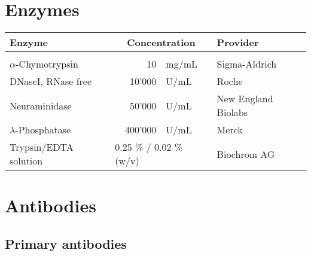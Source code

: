 \section{Enzymes}

\begin{center}

\begin{longtable}{l r p{1cm} l}
\textbf{Enzyme} & \multicolumn{2}{c}{\textbf{Concentration}} & \textbf{Provider}\\
\hline
\\
$\alpha$-Chymotrypsin & 10 & mg/mL & Sigma-Aldrich \\
DNaseI, RNase free & 10'000 & U/mL & Roche \\
Neuraminidase & 50'000 & U/mL & New England Biolabs \\
$\lambda$-Phosphatase & 400'000 & U/mL & Merck \\
Trypsin/EDTA solution & \multicolumn{2}{l}{0.25 \% / 0.02 \% (w/v)} & Biochrom AG \\



\end{longtable}

\end{center}


\section{Antibodies}
\subsection{Primary antibodies}

